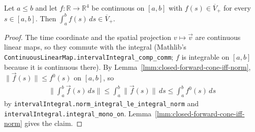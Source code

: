 \begin{lemma}
    \label{lmm:interval-integral-closed-forward-cone}
    \leanok
    Let $a \le b$ and let $f : \mathbb{R} \to \mathbb{R}^4$ be continuous on $[a,b]$ with $f(s) \in \overline{V}_+$ for every $s \in [a,b]$. Then $\int_a^b f(s)\,ds \in \overline{V}_+$.
\end{lemma}
\begin{proof}
    \leanok
    The time coordinate and the spatial projection $v \mapsto \vec v$ are continuous linear maps, so they commute with the integral (Mathlib's \texttt{ContinuousLinearMap.intervalIntegral\_comp\_comm}; $f$ is integrable on $[a,b]$ because it is continuous there). By Lemma~\ref{lmm:closed-forward-cone-iff-norm}, $\|\vec f(s)\| \le f^0(s)$ on $[a,b]$, so
    \begin{align}
        \Big\| \int_a^b \vec f(s)\,ds \Big\| \le \int_a^b \|\vec f(s)\|\,ds \le \int_a^b f^0(s)\,ds
    \end{align}
    by \texttt{intervalIntegral.norm\_integral\_le\_integral\_norm} and \texttt{intervalIntegral.integral\_mono\_on}. Lemma~\ref{lmm:closed-forward-cone-iff-norm} gives the claim.
\end{proof}

